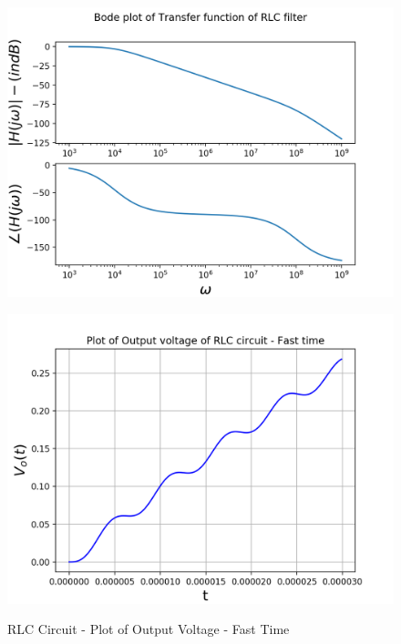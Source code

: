 \documentclass[11pt, a4paper]{article}
\begin{document}
\begin{figure}[H]
   	\centering
   	\includegraphics[scale=0.8]{bode_rlc.png}
   	\label{fig:bode_rlc}
\end{figure}
\begin{figure}[H]
   	\centering
   	\includegraphics[scale=0.6]{RLC_fast.png}
   	\label{fig:RLC_fast}
   	\caption{RLC Circuit - Plot of Output Voltage - Fast Time}
\end{figure}
\end{document}
